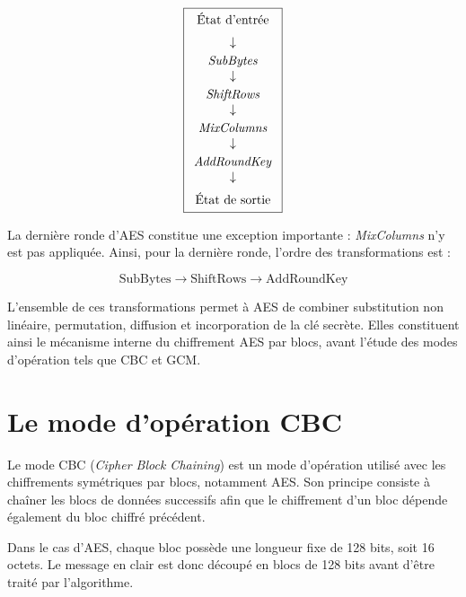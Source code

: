 \documentclass[12pt,a4paper]{article}
\begin{document}
\begin{center}

\[
\boxed{
\begin{array}{c}
\text{État d'entrée}\\[0.2cm]
\downarrow\\[0.1cm]
\text{\textit{SubBytes}}\\
\downarrow\\[0.1cm]
\text{\textit{ShiftRows}}\\
\downarrow\\[0.1cm]
\text{\textit{MixColumns}}\\
\downarrow\\[0.1cm]
\text{\textit{AddRoundKey}}\\
\downarrow\\[0.2cm]
\text{État de sortie}
\end{array}
}
\]

\end{center}

La dernière ronde d'AES constitue une exception importante :
\textit{MixColumns} n'y est pas appliquée. Ainsi, pour la dernière
ronde, l'ordre des transformations est :

\[
\boxed{
\text{SubBytes}
\rightarrow
\text{ShiftRows}
\rightarrow
\text{AddRoundKey}
}
\]

L'ensemble de ces transformations permet à AES de combiner
substitution non linéaire, permutation, diffusion et incorporation
de la clé secrète. Elles constituent ainsi le mécanisme interne du
chiffrement AES par blocs, avant l'étude des modes d'opération tels
que CBC et GCM.


\section{Le mode d'opération CBC}


Le mode CBC (\textit{Cipher Block Chaining}) est un mode d'opération
utilisé avec les chiffrements symétriques par blocs, notamment AES.
Son principe consiste à chaîner les blocs de données successifs afin
que le chiffrement d'un bloc dépende également du bloc chiffré
précédent.

Dans le cas d'AES, chaque bloc possède une longueur fixe de
128 bits, soit 16 octets. Le message en clair est donc découpé en
blocs de 128 bits avant d'être traité par l'algorithme.
\end{document}
